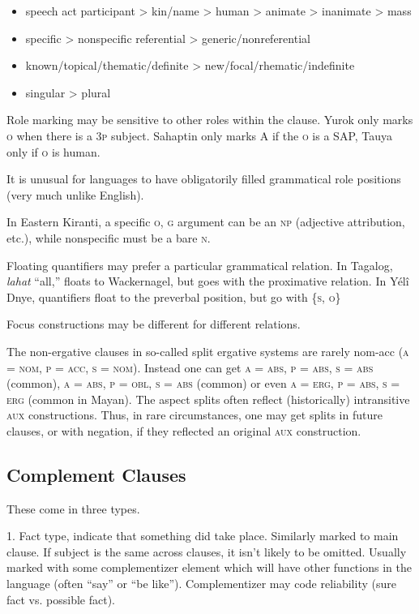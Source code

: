 \documentclass[11pt]{article}
\newcommand{\I}[1]{\textsc{#1}}   %
\newenvironment{grammarlist}%
 {\begin{itemize}\addtolength{\itemsep}{-0.5\baselineskip}\ignorespaces}%
 {\end{itemize}\ignorespacesafterend}
\begin{document}
\begin{grammarlist}
  \item speech act participant > kin/name > human > animate >
    inanimate > mass
  \item specific > nonspecific referential > generic/nonreferential
  \item known/topical/thematic/definite > new/focal/rhematic/indefinite
  \item singular > plural
\end{grammarlist}

Role marking may be sensitive to other roles within the clause.  Yurok
only marks \I{o} when there is a \I{3p} subject.  Sahaptin only marks
\I{A} if the \I{o} is a SAP, Tauya only if \I{o} is human.

It is unusual for languages to have obligatorily filled grammatical
role positions (very much unlike English).

In Eastern Kiranti, a specific \I{o, g} argument can be an \I{np}
(adjective attribution, etc.), while nonspecific must be a bare
\I{n}.

Floating quantifiers may prefer a particular grammatical relation.  In
Tagalog, \textit{lahat} ``all,'' floats to Wackernagel, but goes with
the proximative relation.  In Yélî Dnye, quantifiers float to the
preverbal position, but go with \{\I{s, o}\}

Focus constructions may be different for different relations.

The non-ergative clauses in so-called split ergative systems are
rarely nom-acc (\I{a = nom, p = acc, s = nom}).  Instead one can get
\I{a = abs, p = abs, s = abs} (common), \I{a = abs, p = obl, s = abs}
(common) or even \I{a = erg, p = abs, s = erg} (common in Mayan).  The
aspect splits often reflect (historically) intransitive \I{aux}
constructions.  Thus, in rare circumstances, one may get splits in
future clauses, or with negation, if they reflected an original
\I{aux} construction.


\subsection{Complement Clauses}
These come in three types.

1.  Fact type, indicate that something did take place.  Similarly
marked to main clause.  If subject is the same across clauses, it
isn't likely to be omitted.  Usually marked with some complementizer
element which will have other functions in the language (often ``say''
or ``be like'').  Complementizer may code reliability (sure fact
vs. possible fact).
\end{document}
